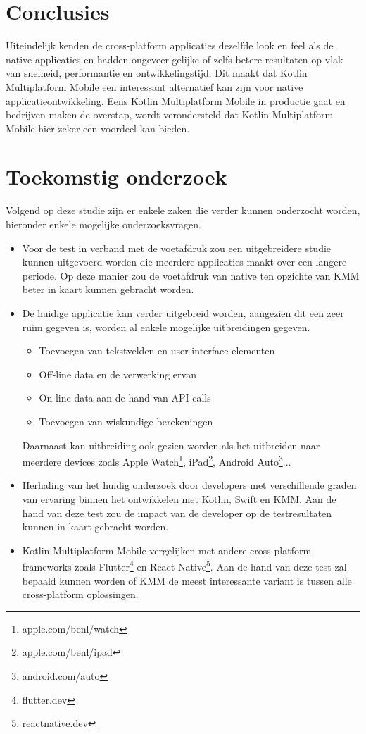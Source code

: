 \documentclass[a0,portrait]{a0poster}
\begin{document}
\begin{multicols}{2}
\color{HoGentAccent1} 
\section*{Conclusies}
\color{black}
Uiteindelijk kenden de cross-platform applicaties dezelfde look en feel als de native applicaties en hadden ongeveer gelijke of zelfs betere resultaten op vlak van snelheid, performantie en ontwikkelingstijd. Dit maakt dat Kotlin Multiplatform Mobile een interessant alternatief kan zijn voor native applicatieontwikkeling. Eens Kotlin Multiplatform Mobile in productie gaat en bedrijven maken de overstap, wordt verondersteld dat Kotlin Multiplatform Mobile hier zeker een voordeel kan bieden.
\color{HoGentAccent1} 
\section*{Toekomstig onderzoek}
\color{black}

Volgend op deze studie zijn er enkele zaken die verder kunnen onderzocht worden, hieronder enkele mogelijke onderzoeksvragen.
\begin{itemize}
    \item Voor de test in verband met de voetafdruk zou een uitgebreidere studie kunnen uitgevoerd worden die meerdere applicaties maakt over een langere periode. Op deze manier zou de voetafdruk van native ten opzichte van KMM beter in kaart kunnen gebracht worden.
    \item De huidige applicatie kan verder uitgebreid worden, aangezien dit een zeer ruim gegeven is, worden al enkele mogelijke uitbreidingen gegeven.
        \begin{itemize}
            \item Toevoegen van tekstvelden en user interface elementen
            \item Off-line data en de verwerking ervan
            \item On-line data aan de hand van API-calls
            \item Toevoegen van wiskundige berekeningen
        \end{itemize}
    Daarnaast kan uitbreiding ook gezien worden als het uitbreiden naar meerdere devices zoals Apple Watch\footnote{apple.com/benl/watch}, iPad\footnote{apple.com/benl/ipad}, Android Auto\footnote{android.com/auto}...
    \item Herhaling van het huidig onderzoek door developers met verschillende graden van
    ervaring binnen het ontwikkelen met Kotlin, Swift en KMM. Aan de hand van deze test zou de impact van de developer op de testresultaten kunnen in kaart gebracht worden.
    \item Kotlin Multiplatform Mobile vergelijken met andere cross-platform frameworks zoals Flutter\footnote{flutter.dev} en React Native\footnote{reactnative.dev}. Aan de hand van deze test zal bepaald kunnen worden of KMM de meest interessante variant is tussen alle cross-platform oplossingen.
\end{itemize}



\end{multicols}
\end{document}
